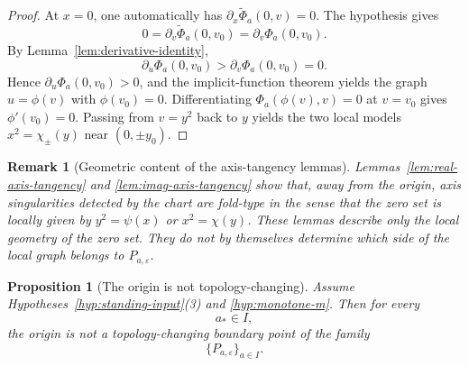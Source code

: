 \documentclass[11pt]{article}
\newtheorem{proposition}[theorem]{Proposition}
\newtheorem{remark}[theorem]{Remark}
\begin{document}
\begin{proof}
At \(x=0\), one automatically has \(\partial_x\widetilde\Phi_a(0,v)=0\). The hypothesis gives
\[
0=\partial_v\widetilde\Phi_a(0,v_0)=\partial_v\Phi_a(0,v_0).
\]
By Lemma~\ref{lem:derivative-identity},
\[
\partial_u\Phi_a(0,v_0)>\partial_v\Phi_a(0,v_0)=0.
\]
Hence \(\partial_u\Phi_a(0,v_0)>0\), and the implicit-function theorem yields the graph \(u=\phi(v)\) with \(\phi(v_0)=0\). Differentiating \(\Phi_a(\phi(v),v)=0\) at \(v=v_0\) gives \(\phi'(v_0)=0\). Passing from \(v=y^2\) back to \(y\) yields the two local models \(x^2=\chi_\pm(y)\) near \((0,\pm y_0)\).
\end{proof}

\begin{remark}[Geometric content of the axis-tangency lemmas]\label{rem:fold-geometry}
Lemmas~\ref{lem:real-axis-tangency} and \ref{lem:imag-axis-tangency} show that, away from the origin, axis singularities detected by the chart are fold-type in the sense that the zero set is locally given by \(y^2=\psi(x)\) or \(x^2=\chi(y)\). These lemmas describe only the local geometry of the zero set. They do not by themselves determine which side of the local graph belongs to \(P_{a,\varepsilon}\).
\end{remark}

\begin{proposition}[The origin is not topology-changing]\label{prop:origin-not-topology-changing}
Assume Hypotheses~\ref{hyp:standing-input}(3) and \ref{hyp:monotone-m}. Then for every
\[
a_*\in I,
\]
the origin is not a topology-changing boundary point of the family
\[
\{P_{a,\varepsilon}\}_{a\in I}.
\]
\end{proposition}
\end{document}

